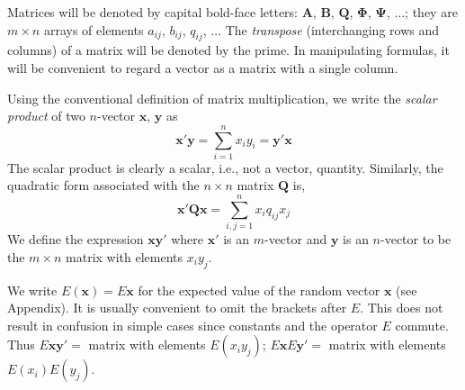 \documentclass{article}
\begin{document}
Matrices will be denoted by capital bold-face letters: $\mathbf{A}$, $\mathbf{B}$, $\mathbf{Q}$, $\boldsymbol{\Phi}$, $\boldsymbol{\Psi}$, $\dotsc$; they are $m \times n$ arrays of elements $a_{ij}$, $b_{ij}$, $q_{ij}$, $\dotsc$ The \emph{transpose} (interchanging rows and columns) of a matrix will be denoted by the prime. In manipulating formulas, it will be convenient to regard a vector as a matrix with a single column.

Using the conventional definition of matrix multiplication, we write the \emph{scalar product} of two $n$-vector $\mathbf{x}$, $\mathbf{y}$ as
\begin{equation*}
\mathbf{x'y}=\sum^n_{i=1}x_iy_i=\mathbf{y'x}
\end{equation*}
The scalar product is clearly a scalar, i.e., not a vector, quantity. Similarly, the quadratic form associated with the $n \times n$ matrix $\mathbf{Q}$ is,
\begin{equation*}
\mathbf{x'Qx}=\sum^n_{i,j=1}x_i q_{ij} x_j
\end{equation*}
We define the expression $\mathbf{xy'}$ where $\mathbf{x'}$ is an $m$-vector and $\mathbf{y}$ is an $n$-vector to be the $m \times n$ matrix with elements $x_i y_j$.

We write $E(\mathbf{x}) = E\mathbf{x}$ for the expected value of the random vector $\mathbf{x}$ (see Appendix). It is usually convenient to omit the brackets after $E$. This does not result in confusion in simple cases since constants and the operator $E$ commute. Thus $E\mathbf{xy'} =$ matrix with elements $E(x_i y_j)$; $E\mathbf{x}E\mathbf{y'} =$ matrix with elements $E(x_i)E(y_j)$.
\end{document}
